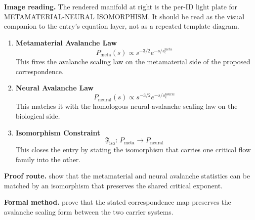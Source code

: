 \begin{samepage}
\noindent\begin{minipage}[t]{0.45\linewidth}
\vspace{0pt}
\raggedright
\scriptsize\textbf{Image reading.} The rendered manifold at right is the per-ID light plate for METAMATERIAL-NEURAL ISOMORPHISM. It should be read as the visual companion to the entry's equation layer, not as a repeated template diagram.\par
\end{minipage}\hfill
\begin{minipage}[t]{0.53\linewidth}
\vspace*{-0.10in}
\raggedright
{}
\end{minipage}
\end{samepage}

\clearpage


\begin{enumerate}[leftmargin=1.6em,itemsep=9pt,topsep=6pt]
\item \textbf{Metamaterial Avalanche Law}
\[
P_{\mathrm{meta}}(s)\propto s^{-3/2}e^{-s/s_{\mathrm{c}}^{\mathrm{meta}}}
\]
This fixes the avalanche scaling law on the metamaterial side of the proposed correspondence.

\item \textbf{Neural Avalanche Law}
\[
P_{\mathrm{neural}}(s)\propto s^{-3/2}e^{-s/s_{\mathrm{c}}^{\mathrm{neural}}}
\]
This matches it with the homologous neural-avalanche scaling law on the biological side.

\item \textbf{Isomorphism Constraint}
\[
\mathfrak{F}_{\mathrm{iso}}:\,
P_{\mathrm{meta}}\longrightarrow P_{\mathrm{neural}}
\]
This closes the entry by stating the isomorphism that carries one critical flow family into the other.
\end{enumerate}

\textbf{Proof route.} show that the metamaterial and neural avalanche statistics can be matched by an isomorphism that preserves the shared critical exponent.

\textbf{Formal method.} prove that the stated correspondence map preserves the avalanche scaling form between the two carrier systems.

\medskip
{}

